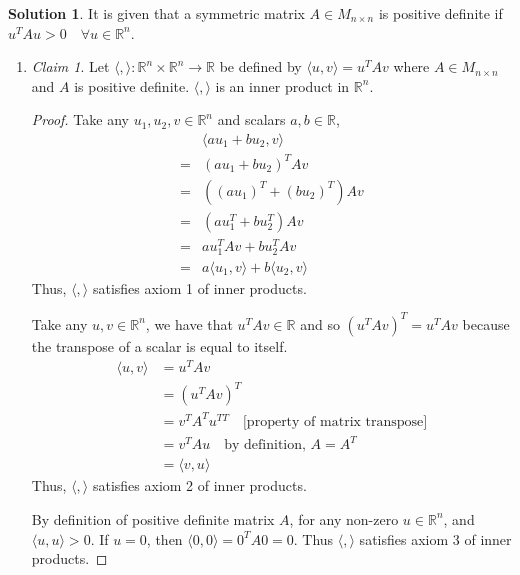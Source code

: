 \documentclass{article}
\theoremstyle{definition}
\newtheorem*{solution}{Solution}
\theoremstyle{remark}
\newtheorem*{theorem}{Claim}
\begin{document}
\begin{solution}

It is given that a symmetric matrix $A\in M_{n\times n}$ is positive definite if $u^T Au>0\quad \forall u\in \mathbb{R}^n$.
\begin{enumerate}[\quad(a)]
 \item 
  \begin{theorem}
  Let $\langle ,\rangle : \mathbb{R}^n \times \mathbb{R}^n\rightarrow \mathbb{R}$ be defined by $\langle u,v \rangle = u^T Av$ where $A\in M_{n\times n}$ and $A$ is positive definite.
  $\langle ,\rangle$ is an inner product in $\mathbb{R}^n$.
  \end{theorem}
  \begin{proof}
  Take any $u_1,u_2,v\in \mathbb{R}^n$ and scalars $a,b\in \mathbb{R}$,
  \begin{align*}
    & \langle au_1+bu_2, v \rangle \\
  = & (au_1+bu_2)^TAv \\
  = & ((au_1)^T + (bu_2)^T)Av \\
  = & (au_1^T+bu_2^T)Av \\
  = & au_1^TAv+bu_2^TAv \\
  = & a\langle u_1,v \rangle + b\langle u_2,v \rangle
  \end{align*}
  Thus, $\langle ,\rangle$ satisfies axiom 1 of inner products.
  
  Take any $u,v\in \mathbb{R}^n$, we have that $u^TAv\in \mathbb{R}$ and so $(u^TAv)^T=u^TAv$ because the transpose of a scalar is equal to itself.
  \begin{align*}
  \langle u,v \rangle & = u^TAv \\
  & = (u^TAv)^T \\
  & = v^TA^Tu^{TT} \quad \text{[property of matrix transpose]} \\
  & = v^TAu \quad \text{by definition, }A=A^T\\
  & = \langle v,u \rangle
  \end{align*}
  Thus, $\langle ,\rangle$ satisfies axiom 2 of inner products.
  
  By definition of positive definite matrix $A$, for any non-zero $u\in \mathbb{R}^n$, and $\langle u,u \rangle > 0$.
  If $u=0$, then $\langle 0,0 \rangle = 0^TA0 = 0$.
  Thus $\langle ,\rangle$ satisfies axiom 3 of inner products.
  

\end{proof}
\end{enumerate}
\end{solution}
\end{document}
